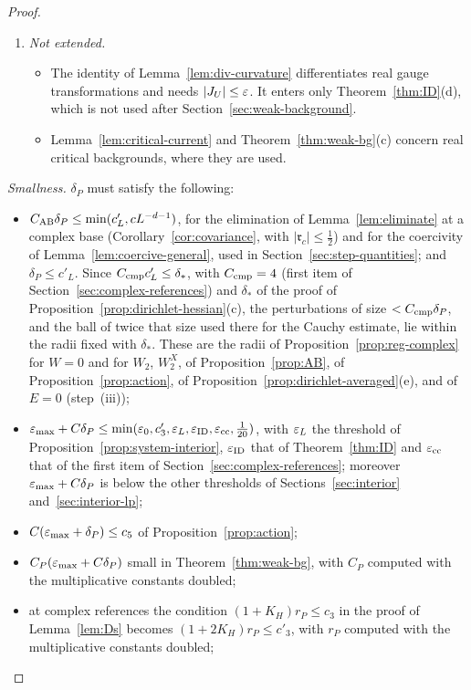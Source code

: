 \begin{proof}
\begin{enumerate}[label=(\roman*)]
\item \emph{Not extended.}
  \begin{itemize}
  \item The identity of Lemma~\ref{lem:div-curvature} differentiates real gauge transformations and needs $|J_U|\le\varepsilon$. It enters only Theorem~\ref{thm:ID}(d), which is not used after Section~\ref{sec:weak-background}.
  \item Lemma~\ref{lem:critical-current} and Theorem~\ref{thm:weak-bg}(c) concern real critical backgrounds, where they are used.
  \end{itemize}
\end{enumerate}
\emph{Smallness.} $\delta_P$ must satisfy the following:
\begin{itemize}
\item $C_{\rm AB}\delta_P\le\min(c'_L,cL^{-d-1})$, for the elimination of Lemma~\ref{lem:eliminate} at a complex base (Corollary~\ref{cor:covariance}, with $|\mathfrak r_c|\le\frac12$) and for the coercivity of Lemma~\ref{lem:coercive-general}, used in Section~\ref{sec:step-quantities}; and $\delta_P\le c'_L$. Since $C_{\rm cmp}c'_L\le\delta_*$, with $C_{\rm cmp}=4$ (first item of Section~\ref{sec:complex-references}) and $\delta_*$ of the proof of Proposition~\ref{prop:dirichlet-hessian}(c), the perturbations of size $<C_{\rm cmp}\delta_P$, and the ball of twice that size used there for the Cauchy estimate, lie within the radii fixed with $\delta_*$. These are the radii of Proposition~\ref{prop:reg-complex} for $W=0$ and for $W_2$, $W_2^X$, of Proposition~\ref{prop:AB}, of Proposition~\ref{prop:action}, of Proposition~\ref{prop:dirichlet-averaged}(e), and of $E=0$ (step~(iii));
\item $\varepsilon_{\max}+C\delta_P\le\min(\varepsilon_0,c'_3,\varepsilon_L,\varepsilon_{\rm ID},\varepsilon_{\rm cc},\frac1{20})$, with $\varepsilon_L$ the threshold of Proposition~\ref{prop:system-interior}, $\varepsilon_{\rm ID}$ that of Theorem~\ref{thm:ID} and $\varepsilon_{\rm cc}$ that of the first item of Section~\ref{sec:complex-references}; moreover $\varepsilon_{\max}+C\delta_P$ is below the other thresholds of Sections~\ref{sec:interior} and~\ref{sec:interior-lp};
\item $C(\varepsilon_{\max}+\delta_P)\le c_5$ of Proposition~\ref{prop:action};
\item $C_P(\varepsilon_{\max}+C\delta_P)$ small in Theorem~\ref{thm:weak-bg}, with $C_P$ computed with the multiplicative constants doubled;
\item at complex references the condition $(1+K_H)r_P\le c_3$ in the proof of Lemma~\ref{lem:Ds} becomes $(1+2K_H)r_P\le c'_3$, with $r_P$ computed with the multiplicative constants doubled;

\end{itemize}
\end{proof}
